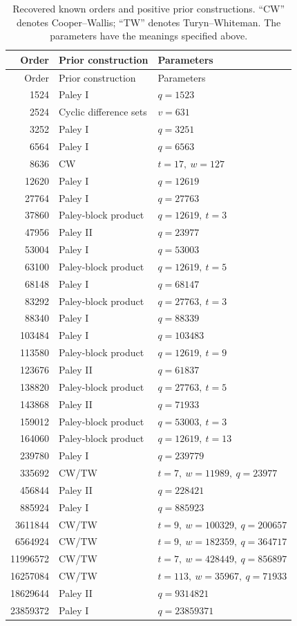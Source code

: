 \documentclass[10pt]{article}
\begin{document}
\begin{longtable}{rll}
\caption{Recovered known orders and positive prior constructions.
``CW'' denotes Cooper--Wallis; ``TW'' denotes Turyn--Whiteman.
The parameters have the meanings specified above.}\label{tab:known-orders}\\
Order & Prior construction & Parameters\\\hline
\endfirsthead
Order & Prior construction & Parameters\\\hline
\endhead
1524 & Paley I & $q=1523$ \\
2524 & Cyclic difference sets & $v=631$ \\
3252 & Paley I & $q=3251$ \\
6564 & Paley I & $q=6563$ \\
8636 & CW & $t=17,\ w=127$ \\
12620 & Paley I & $q=12619$ \\
27764 & Paley I & $q=27763$ \\
37860 & Paley-block product & $q=12619,\ t=3$ \\
47956 & Paley II & $q=23977$ \\
53004 & Paley I & $q=53003$ \\
63100 & Paley-block product & $q=12619,\ t=5$ \\
68148 & Paley I & $q=68147$ \\
83292 & Paley-block product & $q=27763,\ t=3$ \\
88340 & Paley I & $q=88339$ \\
103484 & Paley I & $q=103483$ \\
113580 & Paley-block product & $q=12619,\ t=9$ \\
123676 & Paley II & $q=61837$ \\
138820 & Paley-block product & $q=27763,\ t=5$ \\
143868 & Paley II & $q=71933$ \\
159012 & Paley-block product & $q=53003,\ t=3$ \\
164060 & Paley-block product & $q=12619,\ t=13$ \\
239780 & Paley I & $q=239779$ \\
335692 & CW/TW & $t=7,\ w=11989,\ q=23977$ \\
456844 & Paley II & $q=228421$ \\
885924 & Paley I & $q=885923$ \\
3611844 & CW/TW & $t=9,\ w=100329,\ q=200657$ \\
6564924 & CW/TW & $t=9,\ w=182359,\ q=364717$ \\
11996572 & CW/TW & $t=7,\ w=428449,\ q=856897$ \\
16257084 & CW/TW & $t=113,\ w=35967,\ q=71933$ \\
18629644 & Paley II & $q=9314821$ \\
23859372 & Paley I & $q=23859371$ \\
\hline
\end{longtable}
\end{document}
